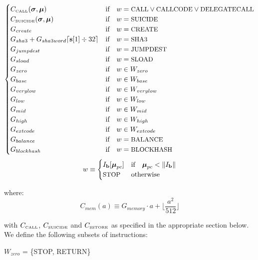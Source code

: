 \documentclass[9pt,oneside]{amsart}
\begin{document}
\begin{equation}
\begin{cases}
C_\text{\tiny CALL}(\boldsymbol{\sigma}, \boldsymbol{\mu}) & \text{if} \quad w = \text{\small CALL} \lor \text{\small CALLCODE} \lor \text{\small DELEGATECALL} \\
C_\text{\tiny SUICIDE}(\boldsymbol{\sigma}, \boldsymbol{\mu}) & \text{if} \quad w = \text{\small SUICIDE} \\
G_{create} & \text{if} \quad w = \text{\small CREATE}\\
G_{sha3}+G_{sha3word} \lceil \mathbf{s}[1] \div 32 \rceil & \text{if} \quad w = \text{\small SHA3}\\
G_{jumpdest} & \text{if} \quad w = \text{\small JUMPDEST}\\
G_{sload} & \text{if} \quad w = \text{\small SLOAD}\\
G_{zero} & \text{if} \quad w \in W_{zero}\\
G_{base} & \text{if} \quad w \in W_{base}\\
G_{verylow} & \text{if} \quad w \in W_{verylow}\\
G_{low} & \text{if} \quad w \in W_{low}\\
G_{mid} & \text{if} \quad w \in W_{mid}\\
G_{high} & \text{if} \quad w \in W_{high}\\
G_{extcode} & \text{if} \quad w \in W_{extcode}\\
G_{balance} & \text{if} \quad w = \text{\small BALANCE}\\
G_{blockhash} & \text{if} \quad w = \text{\small BLOCKHASH}\\
\end{cases}
\end{equation}
\begin{equation}
w \equiv \begin{cases} I_\mathbf{b}[\boldsymbol{\mu}_{pc}] & \text{if} \quad \boldsymbol{\mu}_{pc} < \lVert I_\mathbf{b} \rVert\\
\text{\small STOP} & \text{otherwise}
\end{cases}
\end{equation}

where:
\begin{equation}
C_{mem}(a) \equiv G_{memory} \cdot a + \Big\lfloor \dfrac{a^2}{512} \Big\rfloor
\end{equation}

with $C_\text{\tiny CALL}$, $C_\text{\tiny SUICIDE}$ and $C_\text{\tiny SSTORE}$ as specified in the appropriate section below. We define the following subsets of instructions:

$W_{zero}$ = \{{\small STOP}, {\small RETURN}\}
\end{document}
